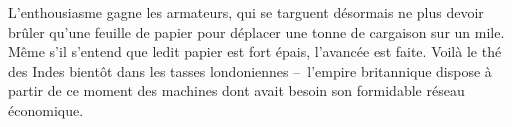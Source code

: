 \begin{figure}
\begin{center}
		\end{center}
		
	\end{figure}

	L’enthousiasme gagne les armateurs, qui se targuent désormais ne plus devoir brûler qu’une feuille de papier pour déplacer une tonne de cargaison sur un mile. Même s’il s’entend que ledit papier est fort épais, l’avancée est faite. Voilà le thé des Indes bientôt dans les tasses londoniennes --\ l’empire britannique dispose à partir de ce moment des machines dont avait besoin son formidable réseau économique.
\atendofhistorysection
